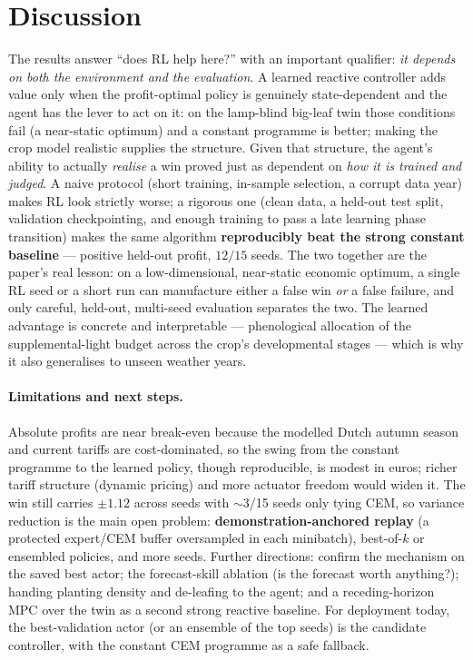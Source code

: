 \documentclass[11pt,a4paper]{article}
\begin{document}
\section{Discussion}
The results answer ``does RL help here?'' with an important qualifier: \emph{it depends on both the
environment and the evaluation}. A learned reactive controller adds value only when the profit-optimal
policy is genuinely state-dependent and the agent has the lever to act on it: on the lamp-blind big-leaf
twin those conditions fail (a near-static optimum) and a constant programme is better; making the crop
model realistic supplies the structure. Given that structure, the agent's ability to actually
\emph{realise} a win proved just as dependent on \emph{how it is trained and judged}. A naive protocol
(short training, in-sample selection, a corrupt data year) makes RL look strictly worse; a rigorous one
(clean data, a held-out test split, validation checkpointing, and enough training to pass a late
learning phase transition) makes the same algorithm \textbf{reproducibly beat the strong constant
baseline} --- positive held-out profit, $12/15$ seeds. The two together are the paper's real lesson: on
a low-dimensional, near-static economic optimum, a single RL seed or a short run can manufacture either
a false win \emph{or} a false failure, and only careful, held-out, multi-seed evaluation separates the
two. The learned advantage is concrete and interpretable --- phenological allocation of the
supplemental-light budget across the crop's developmental stages --- which is why it also generalises to
unseen weather years.

\paragraph{Limitations and next steps.} Absolute profits are near break-even because the modelled Dutch
autumn season and current tariffs are cost-dominated, so the swing from the constant programme to the
learned policy, though reproducible, is modest in euros; richer tariff structure (dynamic pricing) and
more actuator freedom would widen it. The win still carries $\pm1.12$ across seeds with $\sim$3/15 seeds
only tying CEM, so variance reduction is the main open problem: \textbf{demonstration-anchored replay}
(a protected expert/CEM buffer oversampled in each minibatch), best-of-$k$ or ensembled policies, and
more seeds. Further directions: confirm the mechanism on the saved best actor; the forecast-skill
ablation (is the forecast worth anything?); handing planting density and de-leafing to the agent; and a
receding-horizon MPC over the twin as a second strong reactive baseline. For deployment today, the
best-validation actor (or an ensemble of the top seeds) is the candidate controller, with the constant
CEM programme as a safe fallback.
\end{document}

